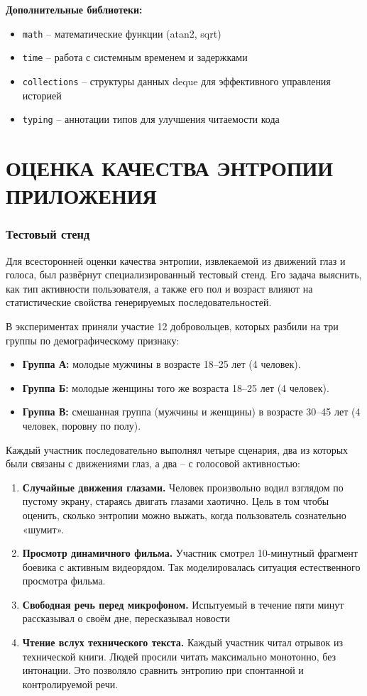 \documentclass[14pt, a4paper]{extreport}
\let\oldchapter\chapter
\renewcommand{\chapter}{%
  \setcounter{subsection}{0}%
  \oldchapter%
}
\begin{document}
\textbf{Дополнительные библиотеки:}
\begin{itemize}
    \item \texttt{math} -- математические функции (atan2, sqrt)
    \item \texttt{time} -- работа с системным временем и задержками
    \item \texttt{collections} -- структуры данных deque для эффективного управления историей
    \item \texttt{typing} -- аннотации типов для улучшения читаемости кода
\end{itemize}

\newpage
\chapter{ОЦЕНКА КАЧЕСТВА ЭНТРОПИИ ПРИЛОЖЕНИЯ}

\subsection{Тестовый стенд}

Для всесторонней оценки качества энтропии, извлекаемой из движений глаз и голоса, был развёрнут специализированный тестовый стенд. Его задача выяснить, как тип активности пользователя, а также его пол и возраст влияют на статистические свойства генерируемых последовательностей. 

В экспериментах приняли участие 12 добровольцев, которых разбили на три группы по демографическому признаку:

\begin{itemize}
\item \textbf{Группа А:} молодые мужчины в возрасте 18–25 лет (4 человек).
\item \textbf{Группа Б:} молодые женщины того же возраста 18–25 лет (4 человек).
\item \textbf{Группа В:} смешанная группа (мужчины и женщины) в возрасте 30–45 лет (4 человек, поровну по полу).
\end{itemize}

Каждый участник последовательно выполнял четыре сценария, два из которых были связаны с движениями глаз, а два -- с голосовой активностью:

\begin{enumerate}
\item \textbf{Случайные движения глазами.} Человек произвольно водил взглядом по пустому экрану, стараясь двигать глазами хаотично. Цель в том чтобы оценить, сколько энтропии можно выжать, когда пользователь сознательно «шумит».
\item \textbf{Просмотр динамичного фильма.} Участник смотрел 10-минутный фрагмент боевика с активным видеорядом. Так моделировалась ситуация естественного просмотра фильма.
\item \textbf{Свободная речь перед микрофоном.} Испытуемый в течение пяти минут рассказывал о своём дне, пересказывал новости 
\item \textbf{Чтение вслух технического текста.} Каждый участник читал отрывок из технической книги. Людей просили читать максимально монотонно, без интонации. Это позволяло сравнить энтропию при спонтанной и контролируемой речи.
\end{enumerate}
\end{document}
